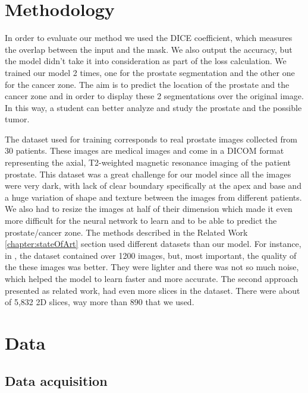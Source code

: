 \documentclass[runningheads,a4paper,11pt]{report}
\begin{document}
\section{Methodology}
\label{section:methodology}
	In order to evaluate our method we used the DICE coefficient, which measures the overlap between the input and the mask. We also output the accuracy, but the model didn't take it into consideration as part of the loss calculation.
	We trained our model 2 times, one for the prostate segmentation and the other one for the cancer zone. The aim is to predict the location of the prostate and the cancer zone and in order to display these 2 segmentations over the original image. In this way, a student can better analyze and study the prostate and the possible tumor.  \par
	The dataset used for training corresponds to real prostate images collected from 30 patients. These images are medical images and come in a DICOM format representing the axial, T2-weighted magnetic resonance imaging of the patient prostate. This dataset was a great challenge for our model since all the images were very dark, with lack of clear boundary specifically at the apex and base and a huge variation of shape and texture between the images from different patients. We also had to resize the images at half of their dimension which made it even more difficult for the neural network to learn and to be able to predict the prostate/cancer zone. The methods described in the Related Work \ref{chapter:stateOfArt} section used different datasets than our model. For instance, in  \cite{deeplySupervisedCNN}, the dataset contained over 1200 images, but, most important, the quality of the these images was better. They were lighter and there was not so much noise, which helped the model to learn faster and more accurate. The second approach\cite{deepCNN} presented as related work, had even more slices in the dataset. There were about of 5,832 2D slices, way more than 890 that we used.
	

\section{Data}
\label{section:data}

\subsection{Data acquisition}
\label{section:data_acquisition}
\end{document}
